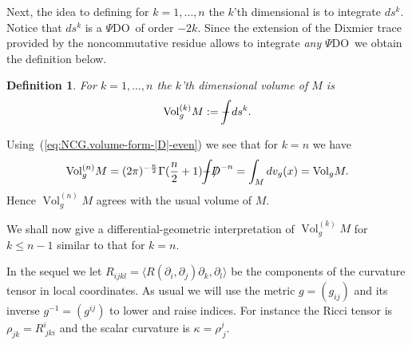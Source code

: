 \documentclass[leqno, 10pt]{amsart}
\newtheorem{definition}{Definition}[section]
\theoremstyle{remark}
\begin{document}
Next, the idea to defining for $k=1,\ldots,n$ the $k$'th dimensional is to integrate $ds^{k}$. Notice that $ds^{k}$ is a {$\Psi$DO}\ of order $-2k$. 
Since the extension of the Dixmier trace provided by the 
noncommutative residue allows to integrate \emph{any} {$\Psi$DO}\ we obtain the definition below.

\begin{definition}
    For $k=1,\ldots,n$ the $k$'th dimensional volume of $M$ is
\begin{equation}
    {{\operatorname{{Vol}}}}^{(k)}_{g}M:= {\ensuremath{-\hspace{-2,4ex}\int}} ds^{k}.
     \label{eq:NCG.k-dim-volume.spin}
\end{equation}
\end{definition}

Using~(\ref{eq:NCG.volume-form-|D|-even}) we see that for $k=n$  we have
\begin{equation}
     {{\operatorname{{Vol}}}}^{(n)}_{g}M= (2\pi)^{-\frac{n}{2}}\Gamma(\frac{n}{2}+1) {\ensuremath{-\hspace{-2,4ex}\int}} {\ensuremath{{/\!\!\!\!D}}}^{-n} = \int_{M}dv_{g}(x)={{\operatorname{{Vol}}}}_{g}M.
     \label{eq:Even.volume-k=n}
\end{equation}
Hence ${{\operatorname{{Vol}}}}^{(n)}_{g}M$ agrees with the usual volume of $M$. 

We shall now give a differential-geometric interpretation of ${{\operatorname{{Vol}}}}^{(k)}_{g}M$ for $k \leq n-1$  similar to that  for $k=n$.  

In the sequel we let $R_{ijkl}={\ensuremath{\langle {R(\partial_{i},\partial_{j})\partial_{k}} , {\partial_{l}} \rangle}}$ be the components of the curvature tensor in local 
coordinates. As usual we will use the metric $g=(g_{ij})$ and its inverse  $g^{-1}=(g^{ij})$ to lower and raise indices. For instance the Ricci tensor is 
$\rho_{jk}=R^{i}_{~jki}$ and the scalar curvature is $\kappa=\rho^{j}_{~j}$.  
\end{document}
